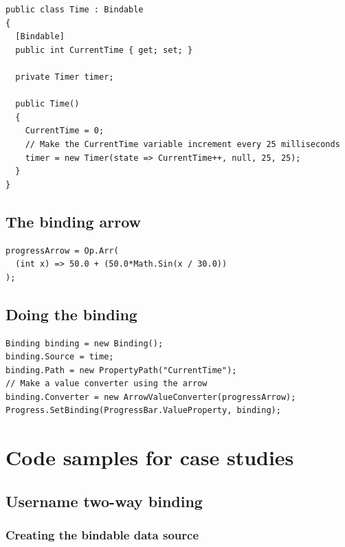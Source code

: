 \documentclass[12pt,twoside,notitlepage]{report}
\begin{document}
\begin{lstlisting}
public class Time : Bindable
{
  [Bindable]
  public int CurrentTime { get; set; }

  private Timer timer;

  public Time()
  {
    CurrentTime = 0;
    // Make the CurrentTime variable increment every 25 milliseconds
    timer = new Timer(state => CurrentTime++, null, 25, 25);
  }
}
\end{lstlisting}

\section{The binding arrow}

\begin{lstlisting}
progressArrow = Op.Arr(
  (int x) => 50.0 + (50.0*Math.Sin(x / 30.0))
);
\end{lstlisting}

\section{Doing the binding}

\begin{lstlisting}
Binding binding = new Binding();
binding.Source = time;
binding.Path = new PropertyPath("CurrentTime");
// Make a value converter using the arrow
binding.Converter = new ArrowValueConverter(progressArrow);
Progress.SetBinding(ProgressBar.ValueProperty, binding);
\end{lstlisting}

\cleardoublepage


\chapter{Code samples for case studies} \label{sec:case_studies}

\section{Username two-way binding} \label{sec:case_study_name}

\subsection{Creating the bindable data source}
\end{document}
